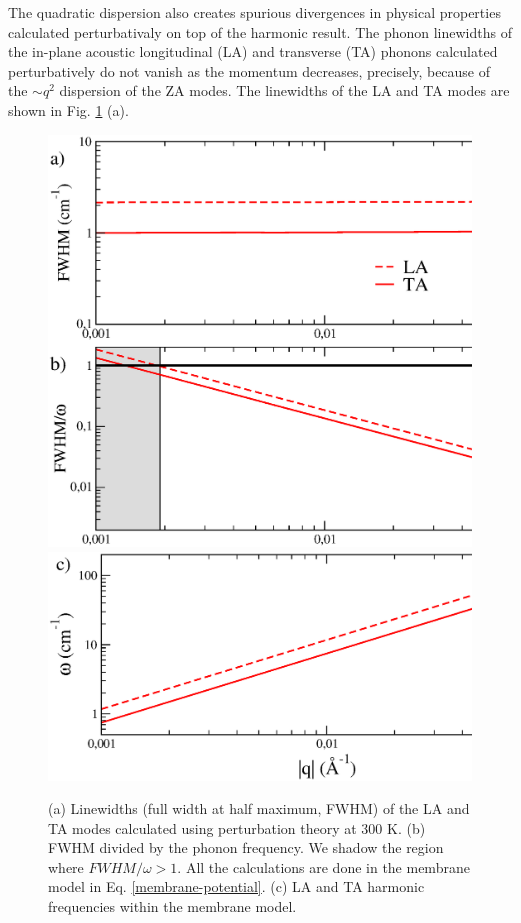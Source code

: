 The quadratic dispersion also creates spurious divergences in physical properties calculated perturbativaly on top of 
the harmonic result. The phonon linewidths of the in-plane acoustic longitudinal (LA) and transverse (TA) phonons 
calculated perturbatively do not vanish as the momentum decreases\cite{paulatto2013anharmonic}, precisely, because of 
the $\sim q^2$ dispersion of the ZA modes\cite{bonini2012acoustic}. The linewidths of the LA and TA modes are shown 
in Fig. \ref{lata-harmonic-lw} (a). 
\begin{figure}[h]
\includegraphics[width=0.8\linewidth]{Figures/lw-graphene-harmonic.eps}
\includegraphics[width=0.8\linewidth]{Figures/freq-harmonic-membrane.eps}
	\caption[Graphene linewidths calculated within perturbation theory]{(a) Linewidths (full width at half 
	maximum, FWHM) of the LA and TA modes calculated using perturbation theory at 300 K. (b) FWHM divided by the 
	phonon frequency. We shadow the region where $FWHM/\omega>1$. All the calculations are done in the membrane 
	model in Eq. \ref{membrane-potential}. (c) LA and TA harmonic frequencies within the membrane model.}
\label{lata-harmonic-lw}
\end{figure}

